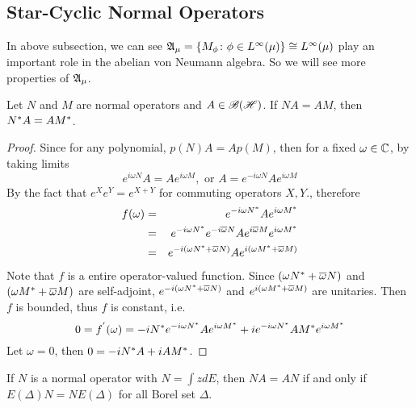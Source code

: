 \documentclass[a4paper,11pt]{report}
\begin{document}
\subsection{Star-Cyclic Normal Operators}

In above subsection, we can see $\mathfrak{A}_{\mu} = \{M_{\phi} \colon \phi \in L^{\infty}(\mu)\} \cong L^{\infty}(\mu)$ play an important role in the abelian von Neumann algebra. So we will see more properties of $\mathfrak{A}_{\mu}$.

\begin{thm}
	Let $N$ and $M$ are normal operators and $A \in \mathscr{B(H)}$. If $NA = AM$, then $N^{*}A = AM^{*}$.
\end{thm}
\begin{proof}
	Since for any polynomial, $p(N)A=Ap(M)$, then for a fixed $\omega \in \mathbb{C}$, by taking limits
	\begin{equation*}
		e^{i\omega N}A = A e^{i\omega M}, \text{ or } A = e^{-i\omega N} A e^{i\omega M}
	\end{equation*}
	By the fact that $e^{X}e^{Y} = e^{X+Y}$ for commuting operators $X,Y$., therefore
	\begin{eqnarray*}
		f(\omega) &=& e^{-i\omega N^{*}} A e^{i\omega M^{*}} \\
		&=& e^{-i\omega N^{*}} e^{-i\overline{\omega} N} A e^{i\overline{\omega} M} e^{i\omega M^{*}} \\
		&=& e^{-i(\omega N^{*}+\overline{\omega} N)} A e^{i(\omega M^{*}+\overline{\omega} M)}
	\end{eqnarray*}
	Note that $f$ is a entire operator-valued function. Since $(\omega N^{*}+\overline{\omega} N)$ and $(\omega M^{*}+\overline{\omega} M)$ are self-adjoint, $e^{-i(\omega N^{*}+\overline{\omega} N)}$ and $e^{i(\omega M^{*}+\overline{\omega} M)}$ are unitaries. Then $f$ is bounded, thus $f$ is constant, i.e.
	\begin{equation*}
		0 = f^{'}(\omega) = -iN^{*}e^{-i\omega N^{*}} A e^{i\omega M^{*}} + ie^{-i\omega N^{*}} A M^{*} e^{i\omega M^{*}}
	\end{equation*}
	Let $\omega = 0$, then $0=-iN^{*}A + iAM^{*}$.
\end{proof}

\begin{cor}
	If $N$ is a normal operator with $N = \int z dE$, then $NA=AN$ if and only if $E(\Delta)N=NE(\Delta)$ for all Borel set $\Delta$.
\end{cor}
\end{document}
